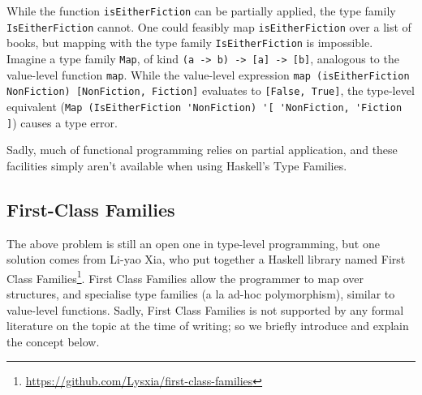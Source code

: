\documentclass[12pt, a4paper, bibliography=totocnumbered]{scrreprt}
\newcommand{\inline}[1]{\lstinline[basicstyle=\ttfamily\footnotesize]{#1}}
\begin{document}
While the function \inline{isEitherFiction} can be partially applied, the type family \inline{IsEitherFiction} cannot. One could feasibly map \inline{isEitherFiction} over a list of books, but mapping with the type family \inline{IsEitherFiction} is impossible. Imagine a type family \inline{Map}, of kind \inline{(a -> b) -> [a] -> [b]}, analogous to the value-level function \inline{map}. While the value-level expression \inline{map (isEitherFiction NonFiction) [NonFiction, Fiction]} evaluates to \inline{[False, True]}, the type-level equivalent (\inline{Map (IsEitherFiction 'NonFiction) '[ 'NonFiction, 'Fiction ]}) causes a type error.

Sadly, much of functional programming relies on partial application, and these facilities simply aren't available when using Haskell's Type Families.




\subsection{First-Class Families}

The above problem is still an open one in type-level programming, but one solution comes from Li-yao Xia, who put together a Haskell library named First Class Families\footnote{\url{https://github.com/Lysxia/first-class-families}}. First Class Families allow the programmer to map over structures, and specialise type families (a la ad-hoc polymorphism), similar to value-level functions. Sadly, First Class Families is not supported by any formal literature on the topic at the time of writing; so we briefly introduce and explain the concept below.
\end{document}
